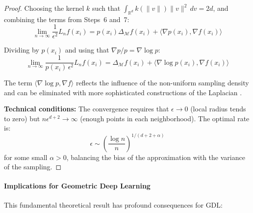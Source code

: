 \begin{proof}
	Choosing the kernel $k$ such that $\int_{\mathbb{R}^d} k(\|v\|) \|v\|^2 \, dv = 2d$, and combining the terms from Steps~6 and~7:
	\[
		\lim_{n \to \infty} \frac{1}{\epsilon^2} L_n f(x_i) = p(x_i) \Delta_\mathcal{M} f(x_i) + \langle \nabla p(x_i), \nabla f(x_i) \rangle
	\]

	Dividing by $p(x_i)$ and using that $\nabla p / p = \nabla \log p$:
	\[
		\lim_{n \to \infty} \frac{1}{p(x_i)\,\epsilon^2} L_n f(x_i) = \Delta_\mathcal{M} f(x_i) + \langle \nabla \log p(x_i), \nabla f(x_i) \rangle
	\]

	The term $\langle \nabla \log p, \nabla f \rangle$ reflects the influence of the non-uniform sampling density and can be eliminated with more sophisticated constructions of the Laplacian \citep{coifman2006diffusion, hein2007graph}.

	\textbf{Technical conditions:} The convergence requires that $\epsilon \to 0$ (local radius tends to zero) but $n\epsilon^{d+2} \to \infty$ (enough points in each neighborhood). The optimal rate is:
	\[
		\epsilon \sim \left(\frac{\log n}{n}\right)^{1/(d+2+\alpha)}
	\]
	for some small $\alpha > 0$, balancing the bias of the approximation with the variance of the sampling.
\end{proof}

\paragraph{Implications for Geometric Deep Learning}

This fundamental theoretical result has profound consequences for \gls{GDL}:

